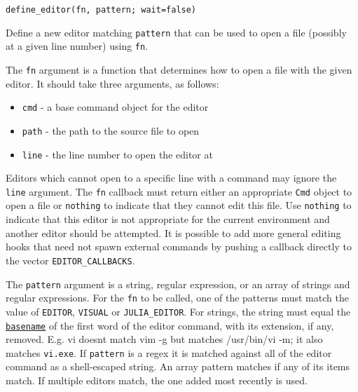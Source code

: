 \begin{adjustwidth}{2em}{0pt}


\begin{verbatim}
define_editor(fn, pattern; wait=false)
\end{verbatim}

Define a new editor matching \texttt{pattern} that can be used to open a file (possibly at a given line number) using \texttt{fn}.

The \texttt{fn} argument is a function that determines how to open a file with the given editor. It should take three arguments, as follows:

\begin{itemize}
\item \texttt{cmd} - a base command object for the editor


\item \texttt{path} - the path to the source file to open


\item \texttt{line} - the line number to open the editor at

\end{itemize}
Editors which cannot open to a specific line with a command may ignore the \texttt{line} argument. The \texttt{fn} callback must return either an appropriate \texttt{Cmd} object to open a file or \texttt{nothing} to indicate that they cannot edit this file. Use \texttt{nothing} to indicate that this editor is not appropriate for the current environment and another editor should be attempted. It is possible to add more general editing hooks that need not spawn external commands by pushing a callback directly to the vector \texttt{EDITOR\_CALLBACKS}.

The \texttt{pattern} argument is a string, regular expression, or an array of strings and regular expressions. For the \texttt{fn} to be called, one of the patterns must match the value of \texttt{EDITOR}, \texttt{VISUAL} or \texttt{JULIA\_EDITOR}. For strings, the string must equal the \hyperlink{16452154606861459390}{\texttt{basename}} of the first word of the editor command, with its extension, if any, removed. E.g. {\textquotedbl}vi{\textquotedbl} doesn{\textquotesingle}t match {\textquotedbl}vim -g{\textquotedbl} but matches {\textquotedbl}/usr/bin/vi -m{\textquotedbl}; it also matches \texttt{vi.exe}. If \texttt{pattern} is a regex it is matched against all of the editor command as a shell-escaped string. An array pattern matches if any of its items match. If multiple editors match, the one added most recently is used.


\end{adjustwidth}
